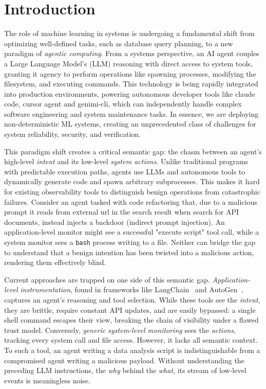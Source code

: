 \section{Introduction}

The role of machine learning in systems is undergoing a fundamental shift from optimizing well-defined tasks, such as database query planning, to a new paradigm of \emph{agentic computing}. From a systems perspective, an AI agent couples a Large Language Model's (LLM) reasoning with direct access to system tools, granting it agency to perform operations like spawning processes, modifying the filesystem, and executing commands. This technology is being rapidly integrated into production environments, powering autonomous developer tools like claude code\cite{claudecode}, cursor agent\cite{cursor} and genimi-cli\cite{geminicli}, which can independently handle complex software engineering and system maintenance tasks. In essence, we are deploying non-deterministic ML systems, creating an unprecedented class of challenges for system reliability, security, and verification.

This paradigm shift creates a critical semantic gap: the chasm between an agent's high-level \emph{intent} and its low-level \emph{system actions}. Unlike traditional programs with predictable execution paths, agents use LLMs and autonomous tools to dynamically generate code and spawn arbitrary subprocesses. This makes it hard for existing observability tools to distinguish benign operations from catastrophic failures. Consider an agent tasked with code refactoring that, due to a malicious prompt it reads from external url in the search result when search for API documents, instead injects a backdoor (indirect prompt injection)\cite{indirect-prompt-inject}. An application-level monitor might see a successful "execute script" tool call, while a system monitor sees a \texttt{bash} process writing to a file. Neither can bridge the gap to understand that a benign intention has been twisted into a malicious action, rendering them effectively blind.

Current approaches are trapped on one side of this semantic gap. \emph{Application-level instrumentation}, found in frameworks like LangChain~\cite{langchain} and AutoGen~\cite{autogen}, captures an agent's reasoning and tool selection. While these tools see the \emph{intent}, they are brittle, require constant API updates, and are easily bypassed: a single shell command escapes their view, breaking the chain of visibility under a flawed trust model. Conversely, \emph{generic system-level monitoring} sees the \emph{actions}, tracking every system call and file access. However, it lacks all semantic context. To such a tool, an agent writing a data analysis script is indistinguishable from a compromised agent writing a malicious payload. Without understanding the preceding LLM instructions, the \emph{why} behind the \emph{what}, its stream of low-level events is meaningless noise.

